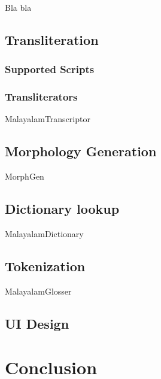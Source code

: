 \documentclass[a4paper]{article}
\begin{document}
Bla bla

\subsection{Transliteration}

\subsubsection{Supported Scripts}

\subsubsection{Transliterators}

MalayalamTranscriptor

\subsection{Morphology Generation}

MorphGen

\subsection{Dictionary lookup}

MalayalamDictionary

\subsection{Tokenization}

MalayalamGlosser

\subsection{UI Design}

\section{Conclusion}

\nocite{*}
\printbibliography
\end{document}
